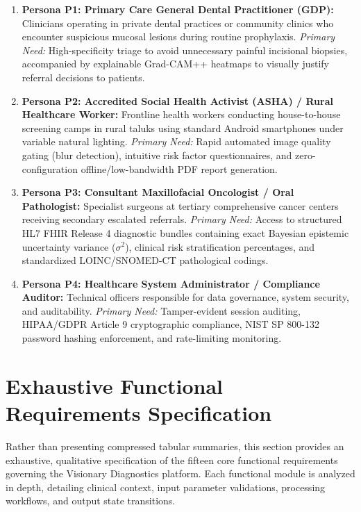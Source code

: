 \documentclass[12pt,a4paper,oneside]{report}
\begin{document}
\begin{enumerate}[label=\arabic*.]
    \item \textbf{Persona P1: Primary Care General Dental Practitioner (GDP):} Clinicians operating in private dental practices or community clinics who encounter suspicious mucosal lesions during routine prophylaxis. \textit{Primary Need:} High-specificity triage to avoid unnecessary painful incisional biopsies, accompanied by explainable Grad-CAM++ heatmaps to visually justify referral decisions to patients.
    
    \item \textbf{Persona P2: Accredited Social Health Activist (ASHA) / Rural Healthcare Worker:} Frontline health workers conducting house-to-house screening camps in rural taluks using standard Android smartphones under variable natural lighting. \textit{Primary Need:} Rapid automated image quality gating (blur detection), intuitive risk factor questionnaires, and zero-configuration offline/low-bandwidth PDF report generation.
    
    \item \textbf{Persona P3: Consultant Maxillofacial Oncologist / Oral Pathologist:} Specialist surgeons at tertiary comprehensive cancer centers receiving secondary escalated referrals. \textit{Primary Need:} Access to structured HL7 FHIR Release 4 diagnostic bundles containing exact Bayesian epistemic uncertainty variance ($\sigma^2$), clinical risk stratification percentages, and standardized LOINC/SNOMED-CT pathological codings.
    
    \item \textbf{Persona P4: Healthcare System Administrator / Compliance Auditor:} Technical officers responsible for data governance, system security, and auditability. \textit{Primary Need:} Tamper-evident session auditing, HIPAA/GDPR Article 9 cryptographic compliance, NIST SP 800-132 password hashing enforcement, and rate-limiting monitoring.
\end{enumerate}

\section{Exhaustive Functional Requirements Specification}
\label{sec:functional_reqs}

Rather than presenting compressed tabular summaries, this section provides an exhaustive, qualitative specification of the fifteen core functional requirements governing the Visionary Diagnostics platform. Each functional module is analyzed in depth, detailing clinical context, input parameter validations, processing workflows, and output state transitions.
\end{document}
